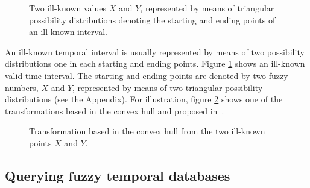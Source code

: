\begin{figure}
\centering

\caption{Two ill-known values $X$ and $Y$, represented by means of triangular possibility distributions denoting the starting and ending points of an ill-known interval. }
\label{fig:interval}
\end{figure}


An ill-known temporal interval is usually represented by means of two possibility distributions one in each starting and ending points. Figure \ref{fig:interval} shows an ill-known valid-time interval. The starting and ending points are denoted by two fuzzy numbers, $X$ and $Y$, represented by means of two triangular possibility distributions (see the Appendix). For illustration, figure \ref{fig:convexhull} shows one of the transformations based in the convex hull and proposed in~\cite{garrido2009}.

\begin{figure}
\centering

\caption{Transformation based in the convex hull from the two ill-known points $X$ and $Y$. }
\label{fig:convexhull}
\end{figure}

\subsection{Querying fuzzy temporal databases}
\label{subsec:querying-time-intervals}


